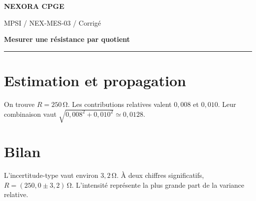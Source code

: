 \documentclass[11pt,a4paper]{article}
\begin{document}
{\small\bfseries\color{nexorablue} NEXORA CPGE}\par
{\small MPSI / NEX-MES-03 / Corrigé}\par
{\LARGE\bfseries Mesurer une résistance par quotient}\par
\vspace{0.25em}\hrule\vspace{0.6em}

\section*{Estimation et propagation}
On trouve $R=250\,\mathrm\Omega$. Les contributions relatives valent $0{,}008$ et $0{,}010$. Leur combinaison vaut $\sqrt{0{,}008^2+0{,}010^2}\simeq0{,}0128$.

\section*{Bilan}
L’incertitude-type vaut environ $3{,}2\,\mathrm\Omega$. À deux chiffres significatifs, $R=(250{,}0\pm3{,}2)\,\mathrm\Omega$. L’intensité représente la plus grande part de la variance relative.
\end{document}
